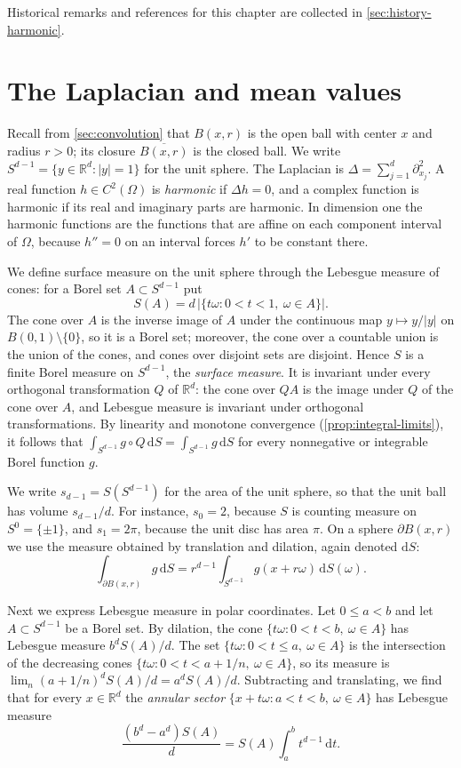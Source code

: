 Historical remarks and references for this chapter are collected in \cref{sec:history-harmonic}.

\section{The Laplacian and mean values}
\label{sec:harmonic-mean-values}
Recall from \cref{sec:convolution} that $B(x,r)$ is the open ball with center $x$ and radius $r>0$; its closure $\overline{B(x,r)}$ is the closed ball. We write $S^{d-1}=\{y\in\mathbb R^d:|y|=1\}$ for the unit sphere. The Laplacian is $\Delta=\sum_{j=1}^d\partial_{x_j}^2$. A real function $h\in C^2(\Omega)$ is \emph{harmonic} if $\Delta h=0$, and a complex function is harmonic if its real and imaginary parts are harmonic. In dimension one the harmonic functions are the functions that are affine on each component interval of $\Omega$, because $h''=0$ on an interval forces $h'$ to be constant there.

We define surface measure on the unit sphere through the Lebesgue measure of cones: for a Borel set $A\subset S^{d-1}$ put
\[
 S(A)=d\,\bigl|\{t\omega:0<t<1,\ \omega\in A\}\bigr|.
\]
The cone over $A$ is the inverse image of $A$ under the continuous map $y\mapsto y/|y|$ on $B(0,1)\setminus\{0\}$, so it is a Borel set; moreover, the cone over a countable union is the union of the cones, and cones over disjoint sets are disjoint. Hence $S$ is a finite Borel measure on $S^{d-1}$, the \emph{surface measure}. It is invariant under every orthogonal transformation $Q$ of $\mathbb R^d$: the cone over $QA$ is the image under $Q$ of the cone over $A$, and Lebesgue measure is invariant under orthogonal transformations. By linearity and monotone convergence (\cref{prop:integral-limits}), it follows that $\int_{S^{d-1}}g\circ Q\,\mathrm dS=\int_{S^{d-1}}g\,\mathrm dS$ for every nonnegative or integrable Borel function $g$.

We write $s_{d-1}=S(S^{d-1})$ for the area of the unit sphere, so that the unit ball has volume $s_{d-1}/d$. For instance, $s_0=2$, because $S$ is counting measure on $S^0=\{\pm1\}$, and $s_1=2\pi$, because the unit disc has area $\pi$. On a sphere $\partial B(x,r)$ we use the measure obtained by translation and dilation, again denoted $\mathrm dS$:
\[
 \int_{\partial B(x,r)}g\,\mathrm dS=r^{d-1}\int_{S^{d-1}}g(x+r\omega)\,\mathrm dS(\omega).
\]

Next we express Lebesgue measure in polar coordinates. Let $0\leq a<b$ and let $A\subset S^{d-1}$ be a Borel set. By dilation, the cone $\{t\omega:0<t<b,\ \omega\in A\}$ has Lebesgue measure $b^dS(A)/d$. The set $\{t\omega:0<t\leq a,\ \omega\in A\}$ is the intersection of the decreasing cones $\{t\omega:0<t<a+1/n,\ \omega\in A\}$, so its measure is $\lim_n(a+1/n)^dS(A)/d=a^dS(A)/d$. Subtracting and translating, we find that for every $x\in\mathbb R^d$ the \emph{annular sector} $\{x+t\omega:a<t<b,\ \omega\in A\}$ has Lebesgue measure
\[
 \frac{(b^d-a^d)S(A)}{d}=S(A)\int_a^bt^{d-1}\,\mathrm dt.
\]

